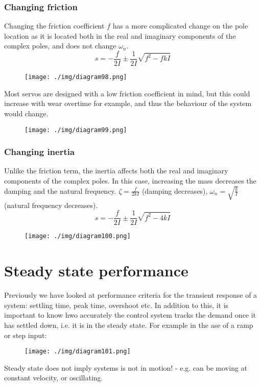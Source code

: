 \subsubsection{Changing friction}
Changing the friction coefficient $f$ has a more complicated change on the pole location as it is located both in the real and imaginary components of the complex poles, and does not change $\omega_n$.
\begin{equation}
  s = - \frac{f}{2I} \pm \frac{1}{2I} \sqrt{f^2 - fkI}
\end{equation}
\begin{figure}[H]
  \centerline{\texttt{[image: ./img/diagram98.png]}}
  \caption{}
\end{figure}
Most servos are designed with a low friction coefficient in mind, but this could increase with wear overtime for example, and thus the behaviour of the system would change.
\begin{figure}[H]
  \centerline{\texttt{[image: ./img/diagram99.png]}}
  \caption{}
\end{figure}
\subsubsection{Changing inertia}
Unlike the friction term, the inertia affects both the real and imaginary components of the complex poles. In this case, increasing the mass decreases the damping and the natural frequency. $\zeta = \frac{f}{2kI}$ (damping decreases), $\omega_n = \sqrt{\frac{k}{I}}$ (natural frequency decreases).
\begin{equation}
  s = - \frac{f}{2I} \pm \frac{1}{2I}\sqrt{f^2 - 4kI}
\end{equation}
\begin{figure}[H]
  \centerline{\texttt{[image: ./img/diagram100.png]}}
  \caption{}
\end{figure}
\section{Steady state performance}
Previously we have looked at performance criteria for the transient response of a system: settling time, peak time, overshoot etc. In addition to this, it is important to know hwo accurately the control system tracks the demand once it has settled down, i.e. it is in the steady state. For example in the ase of a ramp or step input:
\begin{figure}[H]
  \centerline{\texttt{[image: ./img/diagram101.png]}}
  \caption{}
\end{figure}
Steady state does not imply systems is not in motion! - e.g. can be moving at constant velocity, or oscillating.
